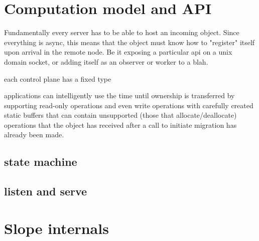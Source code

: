 
\section{Computation model and API}

Fundamentally every server has to be able to host an incoming object.
Since everything is async, this means that the object must know how to
"register" itself upon arrival in the remote node. Be it exposing a particular
api on a unix domain socket, or adding itself as an observer or worker to a blah.

each control plane has a fixed type

applications can intelligently use the time until ownership is transferred by
supporting read-only operations and even write operations with carefully
created static buffers that can contain unsupported (those that allocate/deallocate)
operations that the object has received after a call to initiate migration has
already been made.


\subsection{state machine}

\subsection{listen and serve}

\section{Slope internals}


